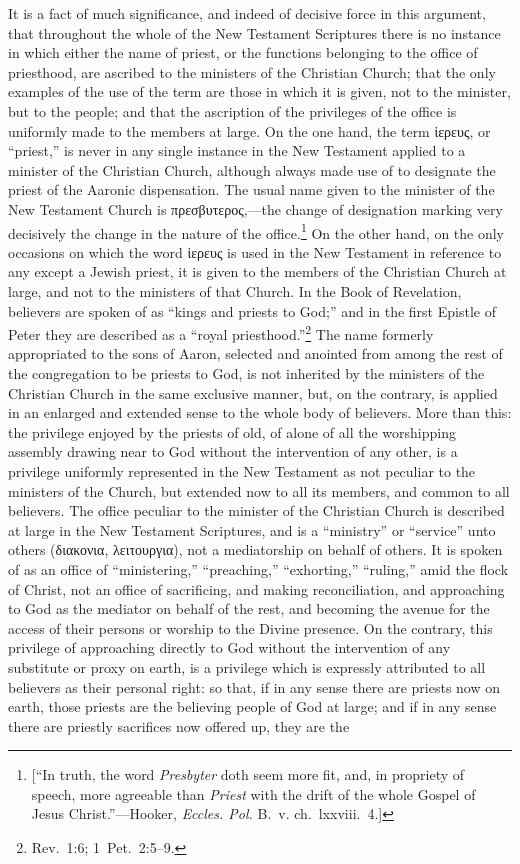 \documentclass[
]{book}
\begin{document}
It is a fact of much significance, and indeed of decisive force in this argument, that throughout the whole of the New Testament Scriptures there is no instance in which either the name of priest, or the functions belonging to the office of priesthood, are ascribed to the ministers of the Christian Church; that the only examples of the use of the term are those in which it is given, not to the minister, but to the people; and that the ascription of the privileges of the office is uniformly made to the members at large. On the one hand, the term \foreignlanguage{greek}{ἱερευς}, or ``priest,'' is never in any single instance in the New Testament applied to a minister of the Christian Church, although always made use of to designate the priest of the Aaronic dispensation. The usual name given to the minister of the New Testament Church is \foreignlanguage{greek}{πρεσβυτερος},---the change of designation marking very decisively the change in the nature of the office.\footnote{{[}``In truth, the word \emph{Presbyter} doth seem more fit, and, in propriety of speech, more agreeable than \emph{Priest} with the drift of the whole Gospel of Jesus Christ.''---Hooker, \emph{Eccles. Pol.} B.~v. ch.~lxxviii.~4.{]}} On the other hand, on the only occasions on which the word \foreignlanguage{greek}{ἱερευς} is used in the New Testament in reference to any except a Jewish priest, it is given to the members of the Christian Church at large, and not to the ministers of that Church. In the Book of Revelation, believers are spoken of as ``kings and priests to God;'' and in the first Epistle of Peter they are described as a ``royal priesthood.''\footnote{Rev.~1:6; 1~Pet.~2:5--9.} The name formerly appropriated to the sons of Aaron, selected and anointed from among the rest of the congregation to be priests to God, is not inherited by the ministers of the Christian Church in the same exclusive manner, but, on the contrary, is applied in an enlarged and extended sense to the whole body of believers. More than this: the privilege enjoyed by the priests of old, of alone of all the worshipping assembly drawing near to God without the intervention of any other, is a privilege uniformly represented in the New Testament as not peculiar to the ministers of the Church, but extended now to all its members, and common to all believers. The office peculiar to the minister of the Christian Church is described at large in the New Testament Scriptures, and is a ``ministry'' or ``service'' unto others (\foreignlanguage{greek}{διακονια, λειτουργια}), not a mediatorship on behalf of others. It is spoken of as an office of ``ministering,'' ``preaching,'' ``exhorting,'' ``ruling,'' amid the flock of Christ, not an office of sacrificing, and making reconciliation, and approaching to God as the mediator on behalf of the rest, and becoming the avenue for the access of their persons or worship to the Divine presence. On the contrary, this privilege of approaching directly to God without the intervention of any substitute or proxy on earth, is a privilege which is expressly attributed to all believers as their personal right: so that, if in any sense there are priests now on earth, those priests are the believing people of God at large; and if in any sense there are priestly sacrifices now offered up, they are the 
\end{document}
